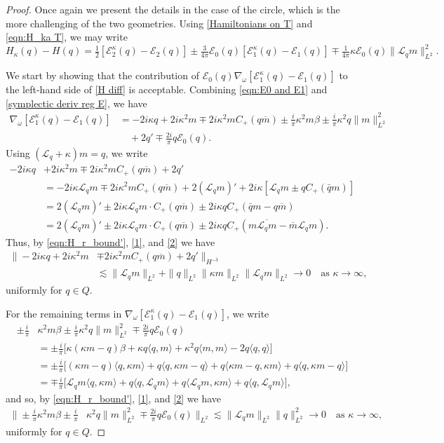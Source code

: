 \documentclass{amsart}
\numberwithin{equation}{section}
\theoremstyle{definition}
\newcommand{\om}{\omega}
\newcommand{\ka}{\kappa}
\newcommand{\E}{\mathcal{E}}
\newcommand{\Lc}{\mathcal{L}}
\newcommand{\na}{\nabla}
\begin{document}
\begin{proof}
Once again we present the details in the case of the circle, which is the more challenging of the two geometries. Using \eqref{Hamiltonians on T} and \eqref{eqn:H_ka T}, we may write
$$
H_\ka(q)-H(q)= \tfrac12[\E_2^\ka(q)-\E_2(q)] \pm \tfrac3{4\pi} \E_0(q)[\E_1^\ka(q)-\E_1(q)]\mp\tfrac1{4\pi}\ka \E_0(q) \|\Lc_q m\|_{L^2}^2.
$$

We start by showing that the contribution of $\E_0(q)\na_\om[\E_1^\ka(q)-\E_1(q)]$ to the left-hand side of \eqref{H diff} is acceptable. Combining \eqref{eqn:E0 and E1} and \eqref{symplectic deriv reg E}, we have
\begin{align*}
\na_\om[\E_1^\ka(q)-\E_1(q)]&=-2i\ka q+2i\ka^2 m\mp2i\ka^2 m C_+(q\overline{m})\pm\tfrac{i}{\pi}\ka^2m\beta\pm\tfrac{i}{\pi}\ka^2 q\|m\|_{L^2}^2\\
&\quad+2q'\mp\tfrac{2i}{\pi}q\E_0(q).
\end{align*}
Using $(\Lc_q+\ka)m=q$, we write
\begin{align*}
-2i\ka q&+2i\ka^2 m\mp2i\ka^2 m C_+(q\overline{m})+ 2q' \\
&= -2i\ka \Lc_qm \mp2i\ka^2 m C_+(q\overline{m})+ 2( \Lc_qm)' + 2i\ka [ \Lc_qm\pm qC_+(\bar q m) ] \\
&= 2( \Lc_qm)'\pm 2i\ka  \Lc_qm \cdot C_+(q\overline{m}) \pm 2i\ka q C_+(\bar q m - q\overline{m})\\
&= 2( \Lc_qm)'\pm 2i\ka  \Lc_qm \cdot C_+(q\overline{m}) \pm 2i\ka q C_+(m\overline{\Lc_qm} - \overline{m}\Lc_qm).
\end{align*}
Thus, by \eqref{eqn:H_r_bound'}, \eqref{1}, and \eqref{2} we have
\begin{align}\label{E1 diff 1}
\bigl\|-2i\ka q+2i\ka^2 m&\mp2i\ka^2 m C_+(q\overline{m})+ 2q'\bigr\|_{H^{-3}}\nonumber\\
&\lesssim \|\Lc_q m\|_{L^2} + \|q\|_{L^2} \|\ka m\|_{L^2} \|\Lc_q m\|_{L^2}\to 0  \quad \text{as $\ka \to \infty$},
\end{align}
uniformly for $q\in Q$.

For the remaining terms in $\na_\om[\E_1^\ka(q)-\E_1(q)]$, we write
\begin{align*}
\pm\tfrac{i}{\pi}&\ka^2m\beta\pm\tfrac{i}{\pi}\ka^2 q\|m\|_{L^2}^2\mp\tfrac{2i}{\pi}q\E_0(q)\\
&=\pm\tfrac{i}{\pi}\bigl[ \ka(\ka m -q) \beta + \ka q\langle q, m\rangle + \ka^2q\langle m, m\rangle -2q\langle q, q\rangle  \bigr]\\
&=\pm\tfrac{i}{\pi} \bigl[ (\ka m -q) \langle q, \ka m \rangle + q\langle q, \ka m -q\rangle + q\langle\ka m -q, \ka m\rangle + q\langle q, \ka m-q\rangle  \bigr]\\
&=\mp\tfrac{i}{\pi} \bigl[  \Lc_qm \langle q, \ka m \rangle + q\langle q, \Lc_qm\rangle + q\langle  \Lc_qm, \ka m\rangle + q\langle q,  \Lc_qm\rangle  \bigr],
\end{align*}
and so,  by \eqref{eqn:H_r_bound'}, \eqref{1}, and \eqref{2} we have
\begin{align}\label{E1 diff 2}
\bigl\|\pm\tfrac{i}{\pi}\ka^2m\beta\pm\tfrac{i}{\pi}&\ka^2 q\|m\|_{L^2}^2\mp\tfrac{2i}{\pi}q\E_0(q)\bigr\|_{L^2}\lesssim \|\Lc_q m\|_{L^2} \|q\|_{L^2}^2\to 0  \quad \text{as $\ka \to \infty$},
\end{align}
uniformly for $q\in Q$.


\end{proof}
\end{document}
